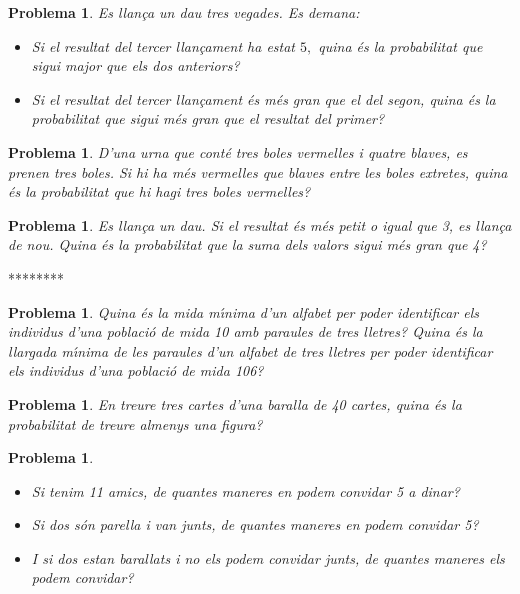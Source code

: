 \documentclass[11pt]{article}
\newcounter{prbcont}
\newtheorem{problema}[prbcont]{Problema}
\begin{document}
\begin{problema}
Es llan\c{c}a un dau tres vegades. Es demana: 
\begin{itemize}
\item [(a)] Si el resultat del tercer llan\c{c}ament ha estat $5,$ quina \'es la probabilitat que sigui major que els dos anteriors?
\item [(b)] Si el resultat del tercer llan\c{c}ament \'es m\'es gran que el del segon, quina \'es la probabilitat que sigui m\'es gran que el resultat del primer?
\end{itemize}
\end{problema}

\begin{problema}
D'una urna que cont\'e tres boles vermelles i quatre blaves, es prenen tres boles. Si hi ha m\'es vermelles que blaves entre les boles extretes, quina \'es la probabilitat que hi hagi tres boles vermelles?
\end{problema}

\begin{problema}
Es llan\c{c}a un dau. Si el resultat \'es m\'es petit o igual que 3, es llan\c{c}a de nou. Quina \'es la probabilitat que la suma dels valors sigui m\'es gran que 4?
\end{problema}

********

\begin{problema}
Quina \'es la mida m\'{\i}nima d'un alfabet per poder identificar els individus d'una poblaci\'o de mida 10 amb paraules de tres lletres? Quina \'es la llargada m\'{\i}nima de les paraules d'un alfabet de tres lletres per poder identificar els individus d'una poblaci\'o de mida 106?
\end{problema}

\begin{problema}
En treure tres cartes d'una baralla de 40 cartes, quina \'es la probabilitat de treure almenys una figura?
\end{problema}

\begin{problema}
\begin{itemize}
\item [(a)] Si tenim 11 amics, de quantes maneres en podem convidar 5 a dinar? 
\item [(b)] Si dos s\'on parella i van junts, de quantes maneres en podem convidar 5? 
\item [(c)] I si dos estan barallats i no els podem convidar junts, de quantes maneres els podem convidar?
\end{itemize}
\end{problema}
\end{document}
